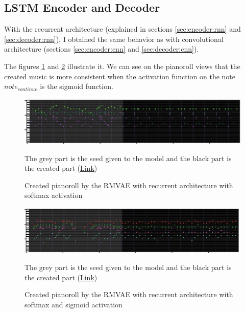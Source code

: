 \documentclass[12pt]{report}
\begin{document}
\subsection{LSTM Encoder and Decoder}

With the recurrent architecture (explained in sections \ref{sec:encoder:rnn} and \ref{sec:decoder:rnn}), I obtained the same behavior as with convolutional architecture (sections \ref{sec:encoder:cnn} and \ref{sec:decoder:cnn}).

The figures \ref{fig:pianoroll:rrmvae:no-binary} and \ref{fig:pianoroll:rrmvae:with-binary} illustrate it.
We can see on the pianoroll views that the created music is more consistent when the activation function on the note $note_{continue}$ is the sigmoid function.

\begin{figure}[htbp]
    \centering
    \includegraphics[width=\textwidth]{images/generated_midis/RRMVAE/pianoroll-rrmvae-no-binary.jpg}
    \caption{Created pianoroll by the RMVAE with recurrent architecture with softmax activation}
    The grey part is the seed given to the model and the black part is the created part
    (\href{https://github.com/ValentinVignal/midiGenerator/blob/master/samples/results/lstm_encoder_decoder.mid}{Link})
    \label{fig:pianoroll:rrmvae:no-binary}
\end{figure}

\begin{figure}[htbp]
    \centering
    \includegraphics[width=\textwidth]{images/generated_midis/RRMVAE/pianoroll-rrmvae-with-binary.jpg}
    \caption{Created pianoroll by the RMVAE with recurrent architecture with softmax and sigmoid activation}
    The grey part is the seed given to the model and the black part is the created part
    (\href{https://github.com/ValentinVignal/midiGenerator/blob/master/samples/results/rrmvae-with-binary.mid}{Link})
    \label{fig:pianoroll:rrmvae:with-binary}
\end{figure}
\end{document}
